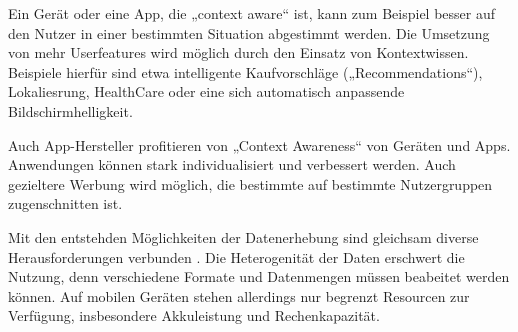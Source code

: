 Ein Gerät oder eine App, die „context aware“ ist, kann zum Beispiel besser auf den Nutzer in einer bestimmten Situation abgestimmt werden. Die Umsetzung von mehr Userfeatures wird möglich durch den Einsatz von Kontextwissen. Beispiele hierfür sind etwa intelligente Kaufvorschläge („Recommendations“), Lokaliesrung, HealthCare oder eine sich automatisch anpassende Bildschirmhelligkeit.

Auch App-Hersteller profitieren von „Context Awareness“ von Geräten und Apps. Anwendungen können stark individualisiert und verbessert werden. Auch gezieltere Werbung wird möglich, die bestimmte auf bestimmte Nutzergruppen zugenschnitten ist.

Mit den entstehden Möglichkeiten der Datenerhebung sind gleichsam diverse Herausforderungen verbunden \cite{context2015, orsini2016}. Die Heterogenität der Daten erschwert die Nutzung, denn verschiedene Formate und Datenmengen müssen beabeitet werden können. Auf mobilen Geräten stehen allerdings nur begrenzt Resourcen zur Verfügung, insbesondere Akkuleistung und Rechenkapazität.